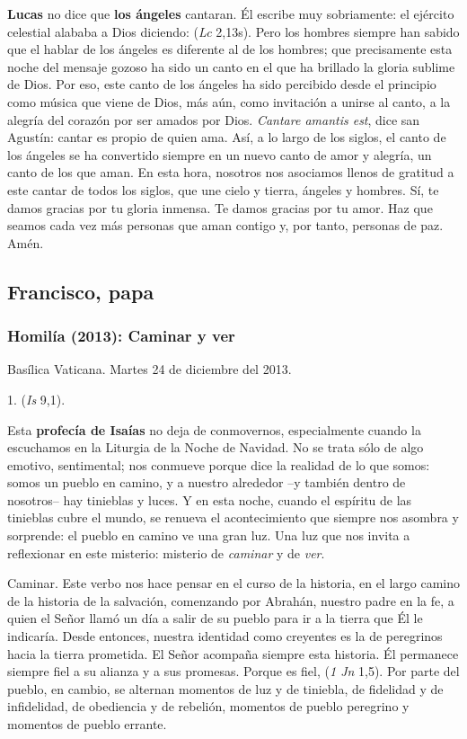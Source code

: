 \textbf{Lucas} no dice que \textbf{los ángeles} cantaran. Él escribe muy sobriamente: el ejército celestial alababa a Dios diciendo:  (\emph{Lc} 2,13s). Pero los hombres siempre han sabido que el hablar de los ángeles es diferente al de los hombres; que precisamente esta noche del mensaje gozoso ha sido un canto en el que ha brillado la gloria sublime de Dios. Por eso, este canto de los ángeles ha sido percibido desde el principio como música que viene de Dios, más aún, como invitación a unirse al canto, a la alegría del corazón por ser amados por Dios. \emph{Cantare amantis est}, dice san Agustín: cantar es propio de quien ama. Así, a lo largo de los siglos, el canto de los ángeles se ha convertido siempre en un nuevo canto de amor y alegría, un canto de los que aman. En esta hora, nosotros nos asociamos llenos de gratitud a este cantar de todos los siglos, que une cielo y tierra, ángeles y hombres. Sí, te damos gracias por tu gloria inmensa. Te damos gracias por tu amor. Haz que seamos cada vez más personas que aman contigo y, por tanto, personas de paz. Amén.

\subsection{Francisco, papa}

\subsubsection{Homilía (2013): Caminar y ver}

Basílica Vaticana. Martes 24 de diciembre del 2013.

1.  (\emph{Is} 9,1).

Esta \textbf{profecía de Isaías} no deja de conmovernos, especialmente cuando la escuchamos en la Liturgia de la Noche de Navidad. No se trata sólo de algo emotivo, sentimental; nos conmueve porque dice la realidad de lo que somos: somos un pueblo en camino, y a nuestro alrededor --y también dentro de nosotros-- hay tinieblas y luces. Y en esta noche, cuando el espíritu de las tinieblas cubre el mundo, se renueva el acontecimiento que siempre nos asombra y sorprende: el pueblo en camino ve una gran luz. Una luz que nos invita a reflexionar en este misterio: misterio de \emph{caminar} y de \emph{ver}.

Caminar. Este verbo nos hace pensar en el curso de la historia, en el largo camino de la historia de la salvación, comenzando por Abrahán, nuestro padre en la fe, a quien el Señor llamó un día a salir de su pueblo para ir a la tierra que Él le indicaría. Desde entonces, nuestra identidad como creyentes es la de peregrinos hacia la tierra prometida. El Señor acompaña siempre esta historia. Él permanece siempre fiel a su alianza y a sus promesas. Porque es fiel,  (\emph{1 Jn} 1,5). Por parte del pueblo, en cambio, se alternan momentos de luz y de tiniebla, de fidelidad y de infidelidad, de obediencia y de rebelión, momentos de pueblo peregrino y momentos de pueblo errante.

